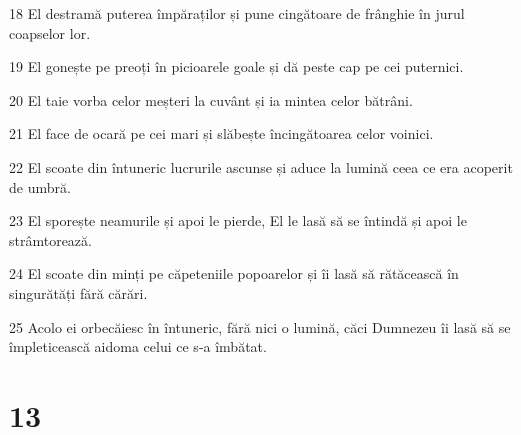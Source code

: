 \par 18 El destramă puterea împăraților și pune cingătoare de frânghie în jurul coapselor lor.
\par 19 El gonește pe preoți în picioarele goale și dă peste cap pe cei puternici.
\par 20 El taie vorba celor meșteri la cuvânt și ia mintea celor bătrâni.
\par 21 El face de ocară pe cei mari și slăbește încingătoarea celor voinici.
\par 22 El scoate din întuneric lucrurile ascunse și aduce la lumină ceea ce era acoperit de umbră.
\par 23 El sporește neamurile și apoi le pierde, El le lasă să se întindă și apoi le strâmtorează.
\par 24 El scoate din minți pe căpeteniile popoarelor și îi lasă să rătăcească în singurătăți fără cărări.
\par 25 Acolo ei orbecăiesc în întuneric, fără nici o lumină, căci Dumnezeu îi lasă să se împleticească aidoma celui ce s-a îmbătat.

\chapter{13}

